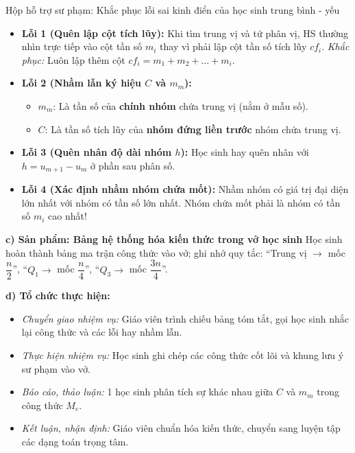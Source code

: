 \documentclass[12pt, a4paper]{article}
\begin{document}
\begin{scaffoldbox}{Hộp hỗ trợ sư phạm: Khắc phục lỗi sai kinh điển của học sinh trung bình - yếu}
\begin{itemize}[leftmargin=0.6cm]
    \item \textbf{Lỗi 1 (Quên lập cột tích lũy):} Khi tìm trung vị và tứ phân vị, HS thường nhìn trực tiếp vào cột tần số $m_i$ thay vì phải lập cột tần số tích lũy $cf_i$. \textit{Khắc phục:} Luôn lập thêm cột $cf_i = m_1 + m_2 + \dots + m_i$.
    \item \textbf{Lỗi 2 (Nhầm lẫn ký hiệu $C$ và $m_m$):}
    \begin{itemize}
        \item $m_m$: Là tần số của \textbf{chính nhóm} chứa trung vị (nằm ở mẫu số).
        \item $C$: Là tần số tích lũy của \textbf{nhóm đứng liền trước} nhóm chứa trung vị.
    \end{itemize}
    \item \textbf{Lỗi 3 (Quên nhân độ dài nhóm $h$):} Học sinh hay quên nhân với $h = u_{m+1} - u_m$ ở phần sau phân số.
    \item \textbf{Lỗi 4 (Xác định nhầm nhóm chứa mốt):} Nhầm nhóm có giá trị đại diện lớn nhất với nhóm có tần số lớn nhất. Nhóm chứa mốt phải là nhóm có tần số $m_i$ cao nhất!
\end{itemize}
\end{scaffoldbox}

\noindent \textbf{c) Sản phẩm: Bảng hệ thống hóa kiến thức trong vở học sinh}
Học sinh hoàn thành bảng ma trận công thức vào vở; ghi nhớ quy tắc: ``Trung vị $\to$ mốc $\dfrac{n}{2}$'', ``$Q_1 \to$ mốc $\dfrac{n}{4}$'', ``$Q_3 \to$ mốc $\dfrac{3n}{4}$''.

\noindent \textbf{d) Tổ chức thực hiện:}
\begin{itemize}[leftmargin=0.8cm]
    \item \textit{Chuyển giao nhiệm vụ:} Giáo viên trình chiếu bảng tóm tắt, gọi học sinh nhắc lại công thức và các lỗi hay nhầm lẫn.
    \item \textit{Thực hiện nhiệm vụ:} Học sinh ghi chép các công thức cốt lõi và khung lưu ý sư phạm vào vở.
    \item \textit{Báo cáo, thảo luận:} 1 học sinh phân tích sự khác nhau giữa $C$ và $m_m$ trong công thức $M_e$.
    \item \textit{Kết luận, nhận định:} Giáo viên chuẩn hóa kiến thức, chuyển sang luyện tập các dạng toán trọng tâm.
\end{itemize}
\end{document}
